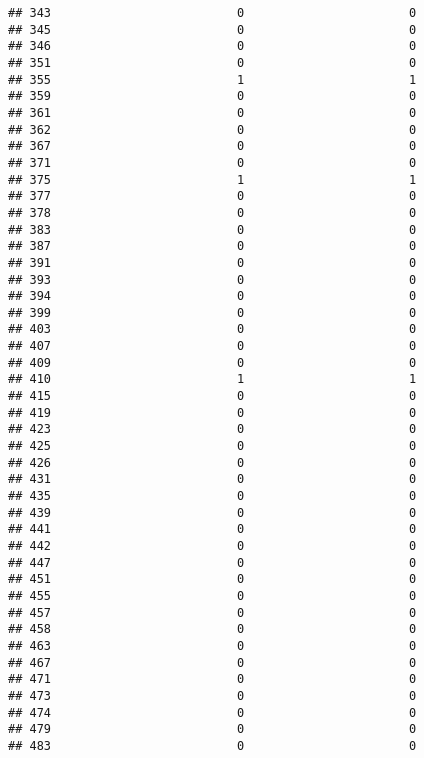 \documentclass[
]{article}
\begin{document}
\begin{verbatim}
## 343                          0                       0
## 345                          0                       0
## 346                          0                       0
## 351                          0                       0
## 355                          1                       1
## 359                          0                       0
## 361                          0                       0
## 362                          0                       0
## 367                          0                       0
## 371                          0                       0
## 375                          1                       1
## 377                          0                       0
## 378                          0                       0
## 383                          0                       0
## 387                          0                       0
## 391                          0                       0
## 393                          0                       0
## 394                          0                       0
## 399                          0                       0
## 403                          0                       0
## 407                          0                       0
## 409                          0                       0
## 410                          1                       1
## 415                          0                       0
## 419                          0                       0
## 423                          0                       0
## 425                          0                       0
## 426                          0                       0
## 431                          0                       0
## 435                          0                       0
## 439                          0                       0
## 441                          0                       0
## 442                          0                       0
## 447                          0                       0
## 451                          0                       0
## 455                          0                       0
## 457                          0                       0
## 458                          0                       0
## 463                          0                       0
## 467                          0                       0
## 471                          0                       0
## 473                          0                       0
## 474                          0                       0
## 479                          0                       0
## 483                          0                       0

\end{verbatim}
\end{document}
